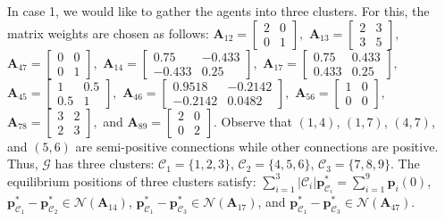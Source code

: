 \documentclass[draftclsnofoot,11pt,onecolumn]{IEEEtran}
\newcommand{\m}[1]{\mathbf{#1}}
\newcommand{\mc}[1]{\mathcal{#1}}
\begin{document}
In case 1, we would like to gather the agents into three clusters. For this, the matrix weights are chosen as follows: 
$\m{A}_{12}=\begin{bmatrix} 2&0\\0&1\end{bmatrix}, $
$\m{A}_{13} = \begin{bmatrix} 2&3\\3&5\end{bmatrix}, $
$\m{A}_{47} = \begin{bmatrix} 0&0\\0&1\end{bmatrix}, $
$\m{A}_{14} = \begin{bmatrix} 0.75& {- 0.433}\\ {- 0.433} & 0.25\end{bmatrix}, $
$\m{A}_{17} = \begin{bmatrix} 0.75& { 0.433}\\ { 0.433} & 0.25\end{bmatrix}, $
$\m{A}_{45} = \begin{bmatrix} 1& { 0.5}\\ { 0.5} & 1\end{bmatrix}, $
$\m{A}_{46} = \begin{bmatrix} {0.9518}&{ - 0.2142}\\{ - 0.2142}&{0.0482}\end{bmatrix}, $
$\m{A}_{56} = \begin{bmatrix} {1}&{0}\\{0}&{0}\end{bmatrix}, $
$\m{A}_{78} = \begin{bmatrix} {3}&{2}\\{2}&{3}\end{bmatrix}, $ and
$\m{A}_{89} = \begin{bmatrix} {2}&{0}\\{0}&{2}\end{bmatrix}.$
Observe that $(1, 4)$, $(1, 7)$, $(4,7)$, and $(5,6)$ are semi-positive connections while other connections are positive. Thus, $\mc{G}$ has three clusters: $\mc{C}_1=\{1, 2, 3\}$, $\mc{C}_2=\{4, 5, 6\}$, $\mc{C}_3=\{7, 8, 9\}$. The equilibrium positions of three clusters satisfy: $\sum_{i=1}^3|\mc{C}_i|\m{p}_{\mc{C}_i}^*=\sum_{i=1}^9\m{p}_i(0)$, $\m{p}_{\mc{C}_1}^*- \m{p}_{\mc{C}_2}^* \in \mc{N}(\m{A}_{14})$, $\m{p}_{\mc{C}_1}^*- \m{p}_{\mc{C}_3}^* \in \mc{N}(\m{A}_{17})$, and $\m{p}_{\mc{C}_1}^*- \m{p}_{\mc{C}_3}^* \in \mc{N}(\m{A}_{47})$.
\end{document}
